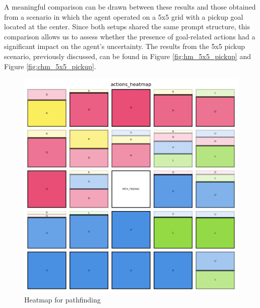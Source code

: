 A meaningful comparison can be drawn between these results and those obtained from
a scenario in which the agent operated on a 5x5 grid with a pickup goal located at
the center. Since both setups shared the same prompt structure, this comparison allows
us to assess whether the presence of goal-related actions had a significant impact
on the agent's uncertainty. The results from the 5x5 pickup scenario, previously
discussed, can be found in Figure \ref{fig:hm_5x5_pickup} and Figure
\ref{fig:chm_5x5_pickup}.

\begin{figure}[h!]
  \centering
  \begin{minipage}[b]{0.45\textwidth}
    \centering
    \includegraphics[width=\textwidth]{
      images/results_discussion/path_finding/actions_heatmap.png
    }
    \caption{Heatmap for pathfinding }
    \label{fig:path_finding_hm}
  \end{minipage}
  \hfill
  \begin{minipage}[b]{0.45\textwidth}
    \centering

\end{minipage}
\end{figure}
